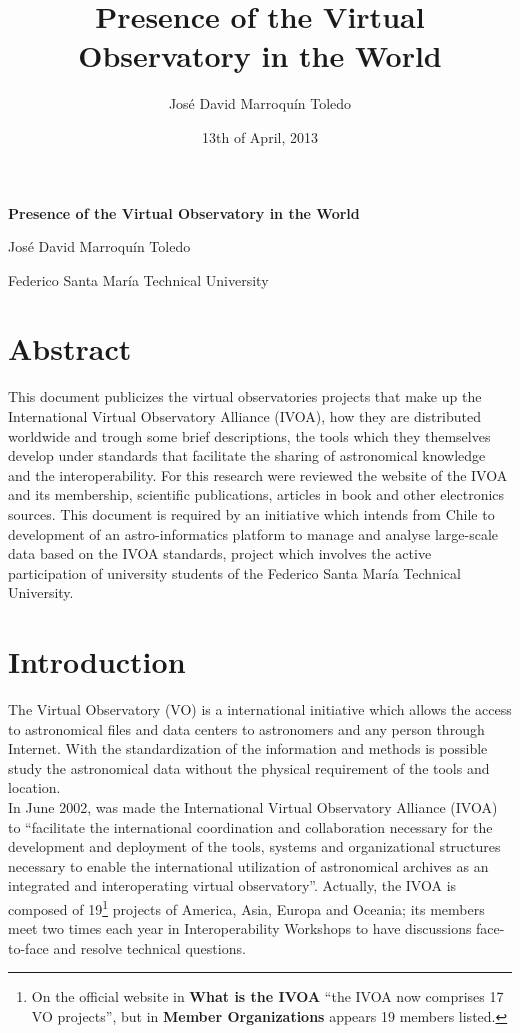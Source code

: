 \documentclass[11pt]{article}
\title{Presence of the Virtual Observatory in the World}
\author{Jos\'{e} David Marroqu\'{i}n Toledo}
\date{13th of April, 2013}
\begin{document}
    \begin{center}
        \huge{\textbf{Presence of the Virtual Observatory in the World}}
    \end{center}
    \begin{center}
        \large{Jos\'{e} David Marroqu\'{i}n Toledo}

        \small{Federico Santa Mar\'{i}a Technical University}
    \end{center}

    \section{Abstract}
        This document publicizes the virtual observatories projects that make up
the International Virtual Observatory Alliance (IVOA), how they are distributed
worldwide and trough some brief descriptions, the tools which they themselves
develop under standards that facilitate the sharing of astronomical knowledge
and the interoperability. For this research were reviewed the website of the
IVOA and its membership, scientific publications, articles in book and other
electronics sources. This document is required by an initiative which intends
from Chile to development of an astro-informatics platform to manage and analyse
large-scale data based on the IVOA standards, project which involves the active
participation of university students of the Federico Santa Mar\'{i}a Technical
University.

    \section{Introduction}
        The Virtual Observatory (VO) is a international initiative which allows
the access to astronomical files and data centers to astronomers and any person
through Internet. With the standardization of the information and methods is
possible study the astronomical data without the physical requirement of the
tools and location.\\

        In June 2002, was made the International Virtual Observatory Alliance
(IVOA) to ``facilitate the international coordination and collaboration
necessary for the development and deployment of the tools, systems and
organizational structures necessary to enable the international utilization of
astronomical archives as an integrated and interoperating virtual observatory''.
Actually, the IVOA is composed of 19\footnote{On the official website in
\textbf{What is the IVOA} ``the IVOA now comprises 17 VO projects'', but in
\textbf{Member Organizations} appears 19 members listed.} projects of America,
Asia, Europa and Oceania; its members meet two times each year in
Interoperability  Workshops to have discussions face-to-face and resolve
technical questions.\\
\end{document}
